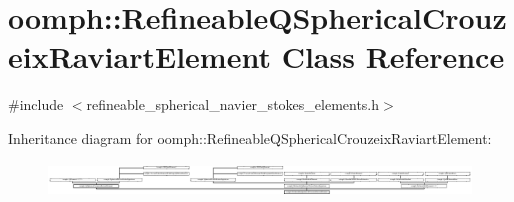 \hypertarget{classoomph_1_1RefineableQSphericalCrouzeixRaviartElement}{}\section{oomph\+:\+:Refineable\+Q\+Spherical\+Crouzeix\+Raviart\+Element Class Reference}
\label{classoomph_1_1RefineableQSphericalCrouzeixRaviartElement}


{\ttfamily \#include $<$refineable\+\_\+spherical\+\_\+navier\+\_\+stokes\+\_\+elements.\+h$>$}

Inheritance diagram for oomph\+:\+:Refineable\+Q\+Spherical\+Crouzeix\+Raviart\+Element\+:\begin{figure}[H]
\begin{center}
\leavevmode
\includegraphics[height=0.928690cm]{classoomph_1_1RefineableQSphericalCrouzeixRaviartElement}
\end{center}
\end{figure}
